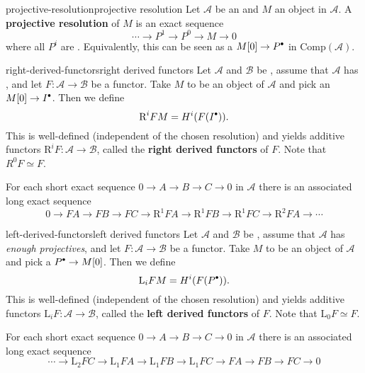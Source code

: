 \begin{topic}{projective-resolution}{projective resolution}
    Let $\mathcal{A}$ be an  and $M$ an object in $\mathcal{A}$. A \textbf{projective resolution} of $M$ is an exact sequence
    \[ \cdots \to P^1 \to P^0 \to M \to 0 \]
    where all $P^i$ are . Equivalently, this can be seen as a  $M[0] \to P^\bdot$ in $\text{Comp}(\mathcal{A})$.
\end{topic}

\begin{topic}{right-derived-functors}{right derived functors}
    Let $\mathcal{A}$ and $\mathcal{B}$ be , assume that $\mathcal{A}$ has , and let $F : \mathcal{A} \to \mathcal{B}$ be a  functor. Take $M$ to be an object of $\mathcal{A}$ and pick an  $M[0] \to I^\bdot$. Then we define
    \[ \text{R}^i F M = H^i(F(I^\bdot)) . \]
    This is well-defined (independent of the chosen resolution) and yields additive functors $\text{R}^i F : \mathcal{A} \to \mathcal{B}$, called the \textbf{right derived functors} of $F$. Note that $R^0 F \simeq F$.
    
    For each short exact sequence $0 \to A \to B \to C \to 0$ in $\mathcal{A}$ there is an associated long exact sequence
    \[ 0 \to FA \to FB \to FC \to \text{R}^1FA \to \text{R}^1FB \to \text{R}^1FC \to \text{R}^2FA \to \cdots \]
\end{topic}

\begin{topic}{left-derived-functors}{left derived functors}
    Let $\mathcal{A}$ and $\mathcal{B}$ be , assume that $\mathcal{A}$ has \textit{enough projectives}, and let $F : \mathcal{A} \to \mathcal{B}$ be a  functor. Take $M$ to be an object of $\mathcal{A}$ and pick a  $P^\bdot \to M[0]$. Then we define
    \[ \text{L}_i F M = H^i(F(P^\bdot)) . \]
    This is well-defined (independent of the chosen resolution) and yields additive functors $\text{L}_i F : \mathcal{A} \to \mathcal{B}$, called the \textbf{left derived functors} of $F$. Note that $\text{L}_0 F \simeq F$.
    
    For each short exact sequence $0 \to A \to B \to C \to 0$ in $\mathcal{A}$ there is an associated long exact sequence
    \[ \cdots \to \text{L}_2FC \to \text{L}_1FA \to \text{L}_1FB \to \text{L}_1FC \to FA \to FB \to FC \to 0 \]
\end{topic}

